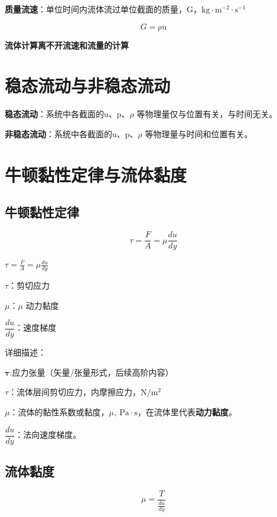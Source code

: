 \documentclass{book}
\DeclareRobustCommand{\bluebold}[1]{\textbf{\textcolor[rgb]{0.31,0.63,0.86}{#1}}}
\begin{document}
\bluebold{质量流速}：单位时间内流体流过单位截面的质量，G，$\mathrm{kg\cdot m^{-2}\cdot s^{-1}}$

\begin{equation}
G = \mathrm{\rho u}
\end{equation}

\bluebold{流体计算离不开流速和流量的计算}

\chapter{稳态流动与非稳态流动}

\bluebold{稳态流动}：系统中各截面的u、p、$\rho$ 等物理量仅与位置有关，与时间无关。

\bluebold{非稳态流动}：系统中各截面的u、p、$\rho$ 等物理量与时间和位置有关。

\chapter{牛顿黏性定律与流体黏度}

\section{牛顿黏性定律}

\begin{equation}
\tau = \frac{F}{A} = \mu \frac{du}{dy}
\end{equation}

\(\tau = \frac{F}{A} = \mu \frac{du}{dy}\)

\(\tau\)：剪切应力

$\mu$：\(\mu\) 动力黏度

\(\dfrac{du}{dy}\)：速度梯度

详细描述：

\(\boldsymbol{\tau}\):应力张量（矢量/张量形式，后续高阶内容）

\(\tau\)：流体层间剪切应力，内摩擦应力，$\mathrm{N / m^2}$

$\mu$：流体的黏性系数或黏度，$\mu,\ \mathrm{Pa\cdot s}$，在流体里代表\bluebold{动力黏度}。

\(\dfrac{du}{dy}\)：法向速度梯度。

\section{流体黏度}

\begin{equation}
\mu = \frac{T}{\frac{du}{dy}}
\end{equation}
\end{document}
